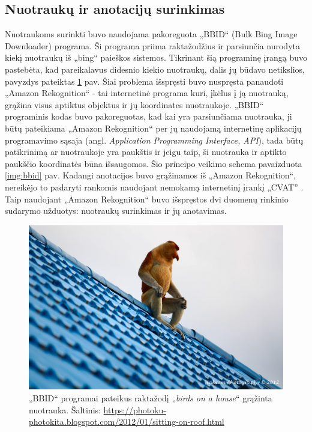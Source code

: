 \documentclass{VUMIFPSkursinis}
\begin{document}
\subsection{Nuotraukų ir anotacijų surinkimas}
Nuotraukoms surinkti buvo naudojama pakoreguota „BBID“ (Bulk Bing Image Downloader) \cite{bbid2014} programa. Ši programa priima raktažodžius ir parsiunčia nurodyta kiekį nuotraukų iš „bing“ paieškos sistemos. Tikrinant šią programinę įrangą buvo pastebėta, kad pareikalavus didesnio kiekio nuotraukų, dalis jų būdavo netikslios, pavyzdys pateiktas \ref{img:monkey_on_roof} pav. Šiai problema išspręsti buvo nuspręsta panaudoti „Amazon Rekognition“ \cite{rekognition} - tai internetinė programa kuri, įkėlus į ją nuotrauką, grąžina visus aptiktus objektus ir jų koordinates nuotraukoje. „BBID“ programinis kodas buvo pakoreguotas, kad kai yra parsiunčiama nuotrauka, ji būtų pateikiama „Amazon Rekognition“ per jų naudojamą internetinę aplikacijų programavimo sąsaja (angl. \emph{Application Programming Interface, API}), tada būtų patikrinimą ar nuotraukoje yra paukštis ir jeigu taip, ši nuotrauka ir aptikto paukščio koordinatės būna išsaugomos. Šio principo veikimo schema pavaizduota \ref{img:bbid} pav. Kadangi anotacijos buvo grąžinamos iš „Amazon Rekognition“, nereikėjo to padaryti rankomis naudojant nemokamą internetinį įrankį „CVAT” \cite{CVAT_ai_Corporation_Computer_Vision_Annotation_2022}. Taip naudojant „Amazon Rekognition“ buvo išspręstos dvi duomenų rinkinio sudarymo užduotys: nuotraukų surinkimas ir jų anotavimas.


\begin{figure}[H]
    \centering
    \includegraphics[scale=0.2]{img/sitting+on+the+roof.jpg}
    \caption{„BBID“ programai pateikus raktažodį „\emph{birds on a house}“ grąžinta nuotrauka. Šaltinis: \href{https://photoku-photokita.blogspot.com/2012/01/sitting-on-roof.html}{https://photoku-photokita.blogspot.com/2012/01/sitting-on-roof.html}}
    \label{img:monkey_on_roof}
\end{figure}
\end{document}
